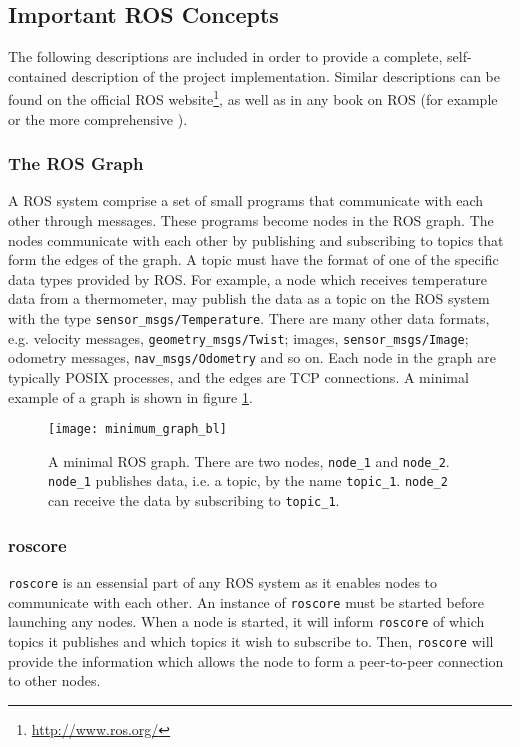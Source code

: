 \subsection{Important ROS Concepts}
\label{sec:ros_concepts}
The following descriptions are included in order to provide a complete, self-contained description of the project implementation. Similar descriptions can be found on the official \ac{ROS} website\footnote{\url{http://www.ros.org/}}, as well as in any book on \ac{ROS} (for example \cite{rosbook15} or the more comprehensive \cite{koubaa2016robot}). 

\subsubsection{The ROS Graph}

A \ac{ROS} system comprise a set of small programs that communicate with each other through messages. These programs become nodes in the \ac{ROS} graph. The nodes communicate with each other by publishing and subscribing to topics that form the edges of the graph. A topic must have the format of one of the specific data types provided by \ac{ROS}. For example, a node which receives temperature data from a thermometer, may publish the data as a topic on the \ac{ROS} system with the type \texttt{sensor\_msgs/Temperature}. There are many other data formats, e.g. velocity messages, \texttt{geometry\_msgs/Twist}; images, \texttt{sensor\_msgs/Image}; odometry messages, \texttt{nav\_msgs/Odometry} and so on. Each node in the graph are typically POSIX processes, and the edges are TCP connections\cite{rosbook15}. A minimal example of a graph is shown in figure \ref{fig:minimum_graph}.

\begin{figure}[h]
    \centering
    \texttt{[image: minimum\_graph\_bl]}
    \caption{A minimal \ac{ROS} graph. There are two nodes, \texttt{node\_1} and \texttt{node\_2}. \texttt{node\_1} publishes data, i.e. a topic, by the name \texttt{topic\_1}. \texttt{node\_2} can receive the data by subscribing to \texttt{topic\_1}.}
    \label{fig:minimum_graph}
\end{figure}

\subsubsection{roscore}

\texttt{roscore} is an essensial part of any \ac{ROS} system as it enables nodes to communicate with each other. An instance of \texttt{roscore} must be started before launching any nodes. When a node is started, it will inform \texttt{roscore} of which topics it publishes and which topics it wish to subscribe to. Then, \texttt{roscore} will provide the information which allows the node to form a peer-to-peer connection to other nodes.

